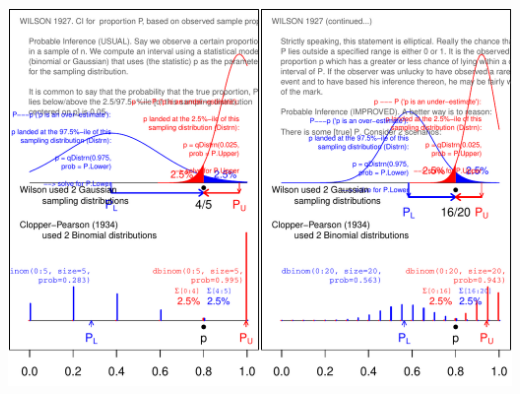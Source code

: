 \documentclass[10pt]{beamer}\usepackage[]{graphicx}\usepackage[]{color}
\makeatletter
\def\maxwidth{ %
  \ifdim\Gin@nat@width>\linewidth
    \linewidth
  \else
    \Gin@nat@width
  \fi
}
\newenvironment{knitrout}{}{} %
\makeatother
\begin{document}
\begin{frame}
\begin{knitrout}\tiny
{}\color{fgcolor}

{\centering \includegraphics[width=\maxwidth]{figure/wilson-1} 

}


\end{knitrout}
\end{frame}
\end{document}
